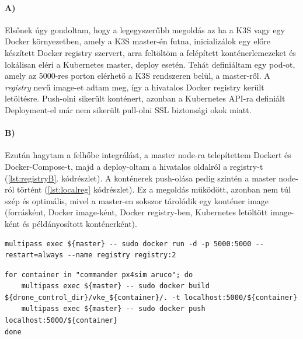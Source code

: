\noindent
\paragraph{A)}
Elsőnek úgy gondoltam, hogy a legegyszerűbb megoldás az ha a K3S vagy egy Docker környezetben, amely a K3S master-én futna, inicializálok egy előre készített Docker registry szervert, arra feltöltöm a felépített konténerlemezeket és lokálisan eléri a Kubernetes master, deploy esetén. Tehát definiáltam egy pod-ot, amely az 5000-res porton elérhető a K3S rendszeren belül, a master-ről. A \emph{registry} nevű image-et adtam meg, így a hivatalos Docker registry került letöltésre. Push-olni sikerült konténert, azonban a Kubernetes API-ra definiált Deployment-el már nem sikerült pull-olni SSL biztonsági okok miatt. \\

\noindent
\paragraph{B)}
Ezután hagytam a felhőbe integrálást, a master node-ra telepítettem Dockert és Docker-Compose-t, majd a deploy-oltam a hivatalos oldalról a registry-t (\ref{lst:registryB}. kódrészlet). A konténerek push-olása pedig szintén a master node-ról történt (\ref{lst:localreg} kódrészlet). Ez a megoldás működött, azonban nem túl szép és optimális, mivel a master-en sokszor tárolódik egy konténer image (forrásként, Docker image-ként, Docker registry-ben, Kubernetes letöltött image-ként és példányosított konténerként).
\begin{minipage}{\linewidth}
\begin{lstlisting}[caption={Docker registry inicializálás a master docker környezetében},label={lst:registryB}]
multipass exec ${master} -- sudo docker run -d -p 5000:5000 --restart=always --name registry registry:2
\end{lstlisting}
\end{minipage}
\begin{minipage}{\linewidth}
\begin{lstlisting}[caption={Build és push lokál konténer registry-be},label={lst:localreg}]
for container in "commander px4sim aruco"; do
	multipass exec ${master} -- sudo docker build ${drone_control_dir}/vke_${container}/. -t localhost:5000/${container}
	multipass exec ${master} -- sudo docker push localhost:5000/${container}
done
\end{lstlisting}
\end{minipage}

